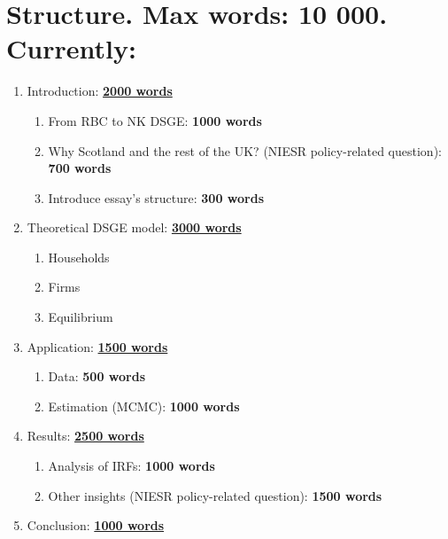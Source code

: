 \section*{Structure. Max words: 10 000. Currently: }

\begin{enumerate}
    \item Introduction: \underline{\textbf{2000 words}}
    \begin{enumerate}
        \item From RBC to NK DSGE: \textbf{1000 words}
        \item Why Scotland and the rest of the UK? (NIESR policy-related question): \textbf{700 words}
        \item Introduce essay's structure: \textbf{300 words}
    \end{enumerate}
    \item Theoretical DSGE model: \underline{\textbf{3000 words}}
    \begin{enumerate}
        \item Households
        \item Firms
        \item Equilibrium
    \end{enumerate}
    \item Application: \underline{\textbf{1500 words}}
    \begin{enumerate}
        \item Data: \textbf{500 words}
        \item Estimation (MCMC): \textbf{1000 words}
    \end{enumerate}
    \item Results: \underline{\textbf{2500 words}}
    \begin{enumerate}
        \item Analysis of IRFs: \textbf{1000 words}
        \item Other insights (NIESR policy-related question): \textbf{1500 words}
    \end{enumerate}
    \item Conclusion: \underline{\textbf{1000 words}}
\end{enumerate}